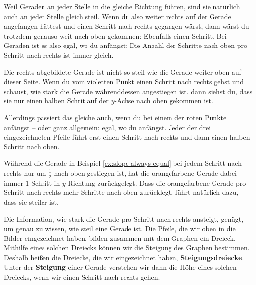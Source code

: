 \documentclass[../../main.tex]{subfiles}
\begin{document}
Weil Geraden an jeder Stelle in die gleiche Richtung führen, sind sie natürlich auch an jeder Stelle gleich steil. Wenn du also weiter rechts auf der Gerade angefangen hättest und einen Schritt nach rechts gegangen wärst, dann wärst du trotzdem genauso weit nach oben gekommen: Ebenfalls einen Schritt. Bei Geraden ist es also egal, wo du anfängst: Die Anzahl der Schritte nach oben pro Schritt nach rechts ist immer gleich.

\begin{example}{}
    Die rechts abgebildete Gerade ist nicht so steil wie die Gerade weiter oben auf dieser Seite. Wenn du vom violetten Punkt einen Schritt nach rechts gehst und schaust, wie stark die Gerade währenddessen angestiegen ist, dann siehst du, dass sie nur einen halben Schrit auf der $y$-Achse nach oben gekommen ist.
    
    Allerdings passiert das gleiche auch, wenn du bei einem der roten Punkte anfängst -- oder ganz allgemein: egal, wo du anfängst. Jeder der drei eingezeichneten Pfeile führt erst einen Schritt nach rechts und dann einen halben Schritt nach oben.
\end{example}

Während die Gerade in Beispiel \ref{ex:slope-always-equal} bei jedem Schritt nach rechts nur um $\frac{1}{2}$ nach oben gestiegen ist, hat die orangefarbene Gerade dabei immer $1$ Schritt in $y$-Richtung zurückgelegt. Dass die orangefarbene Gerade pro Schritt nach rechts mehr Schritte nach oben zurücklegt, führt natürlich dazu, dass sie steiler ist.

Die Information, wie stark die Gerade pro Schritt nach rechts ansteigt, genügt, um genau zu wissen, wie steil eine Gerade ist. Die Pfeile, die wir oben in die Bilder eingezeichnet haben, bilden zusammen mit dem Graphen ein Dreieck. Mithilfe eines solchen Dreiecks können wir die Steigung des Graphen bestimmen. Deshalb heißen die Dreiecke, die wir eingezeichnet haben, \textbf{Steigungsdreiecke}. Unter der \textbf{Steigung} einer Gerade verstehen wir dann die Höhe eines solchen Dreiecks, wenn wir einen Schritt nach rechts gehen.
\end{document}
